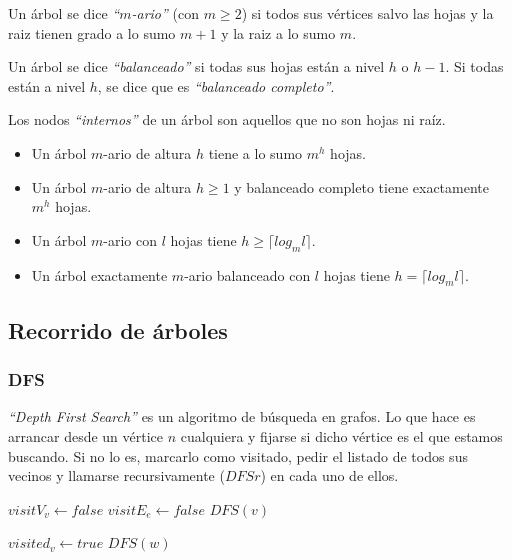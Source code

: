 Un \'arbol se dice \emph{``$m$-ario''} (con $m \geq 2$) si todos sus v\'ertices salvo las hojas y la raiz tienen grado a lo sumo $m+1$ y la raiz a lo sumo $m$.

Un \'arbol se dice \emph{``balanceado''} si todas sus hojas est\'an a nivel $h$ o $h-1$. Si todas est\'an a nivel $h$, se dice que es \emph{``balanceado completo''}.

Los nodos \emph{``internos''} de un \'arbol son aquellos que no son hojas ni ra\'iz.

\begin{itemize}
\item Un \'arbol $m$-ario de altura $h$ tiene a lo sumo $m^h$ hojas. 
\item Un \'arbol $m$-ario de altura $h \geq 1$ y balanceado completo tiene exactamente $m^h$ hojas.
\item Un \'arbol $m$-ario con $l$ hojas tiene $h \geq \lceil log_{m}l \rceil$.
\item Un \'arbol exactamente $m$-ario balanceado con $l$ hojas tiene $h = \lceil log_{m}l \rceil$.
\end{itemize}

\subsection{Recorrido de \'arboles}
\subsubsection{DFS}

\emph{``Depth First Search''} es un algoritmo de b\'usqueda en grafos. Lo que hace es arrancar desde un v\'ertice $n$ cualquiera y fijarse si dicho v\'ertice es el que estamos buscando. Si no lo es, marcarlo como visitado, pedir el listado de todos sus vecinos y llamarse recursivamente ($DFSr$) en cada uno de ellos.
\vspace{8px}

\begin{algorithm}
\begin{algorithmic}[1]
    \State $visitV_v \gets false$
  \EndFor
    \State $visitE_e \gets false$
  \EndFor
      \State $DFS(v)$
    \EndIf
  \EndFor
\EndFunction
\end{algorithmic}
\end{algorithm}

\begin{algorithm}
\begin{algorithmic}[1]
  \State $visited_v \gets true$
      \State $DFS(w)$
    \EndIf
  \EndFor
\EndFunction
\end{algorithmic}
\end{algorithm}

